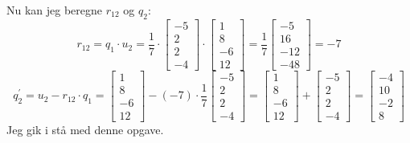 \documentclass{article}
\begin{document}
Nu kan jeg beregne $r_{12}$ og $q_2$:
$$
r_{12}=q_1 \cdot u_2=\frac{1}{7} \cdot\left[\begin{array}{c}
-5 \\
2 \\
2 \\
-4
\end{array}\right] \cdot\left[\begin{array}{c}
1 \\
8 \\
-6 \\
12
\end{array}\right]=\frac{1}{7}\left[\begin{array}{c}
-5 \\
16 \\
-12 \\
-48
\end{array}\right]=-7
$$
$$
q_2^{\prime}=u_2-r_{12} \cdot q_1=\left[\begin{array}{c}
1 \\
8 \\
-6 \\
12
\end{array}\right]-(-7) \cdot \frac{1}{7}\left[\begin{array}{c}
-5 \\
2 \\
2 \\
-4
\end{array}\right]=\left[\begin{array}{c}
1 \\
8 \\
-6 \\
12
\end{array}\right]+\left[\begin{array}{c}
-5 \\
2 \\
2 \\
-4
\end{array}\right]=\left[\begin{array}{c}
-4 \\
10 \\
-2 \\
8
\end{array}\right]
$$
Jeg gik i stå med denne opgave.
\end{document}
